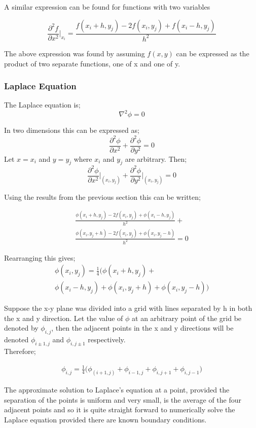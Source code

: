 \documentclass[aps,twocolumn,pre,nofootinbib,10pt]{revtex4-1}
\begin{document}
A similar expression can be found for functions with two variables

\[\frac{\partial^2f}{\partial x^2}\Bigg|_{x_i} = \frac{f(x_i+h,y_j)-2f(x_i,y_j)+f(x_i-h,y_j)}{h^2}\]

The above expression was found by assuming $f(x,y)$ can be expressed as the product of two separate functions, one of x and one of y. \\


\subsubsection{Laplace Equation}

The Laplace equation is;
\[\nabla^2\phi = 0\]

In two dimensions this can be expressed as;
\[\frac{\partial^2\phi}{\partial x^2} + \frac{\partial^2\phi}{\partial y^2} = 0\]
Let \(x=x_i\) and \(y=y_j\) where \(x_i\) and \(y_j\) are arbitrary. Then;
\[\frac{\partial^2\phi}{\partial x^2}\Bigg|_{(x_{i},y_{j})} + \frac{\partial^2\phi}{\partial y^2}\Bigg|_{(x_{i},y_{j})} = 0\]

Using the results from the previous section this can be written;

\begin{gather*}
\frac{\phi(x_i+h,y_j)-2f(x_i,y_j)+\phi(x_i-h,y_j)}{h^2}+ \\
\frac{\phi(x_i,y_j+h)-2f(x_i,y_j)+\phi(x_i,y_j-h)}{h^2}=0
\end{gather*}

Rearranging this gives;
\begin{gather*}
\phi(x_i,y_j)=\frac{1}{4}\Bigg(\phi(x_i+h,y_j)+ \\
\phi(x_i-h,y_j)+\phi(x_i,y_j+h)+\phi(x_i,y_j-h)\Bigg)
\end{gather*}

Suppose the x-y plane was divided into a grid with lines separated by h in both the x and y direction. Let the value of \(\phi\) at an arbitrary point of the grid be denoted by \(\phi_{i,j}\), then the adjacent points in the x and y directions will be denoted \(\phi_{i\pm1,j}\) and \(\phi_{i,j\pm1}\) respectively.\\Therefore;

\begin{gather*}
\phi_{i,j}=\frac{1}{4}\Bigg(\phi_{(i+1,j)}+
\phi_{i-1,j}+\phi_{i,j+1}+\phi_{i,j-1}\Bigg)
\end{gather*}

The approximate solution to Laplace's equation at a point, provided the separation of the points is uniform and very small, is the average of the four adjacent points and so it is quite straight forward to numerically solve the Laplace equation provided there are known boundary conditions.
\end{document}
